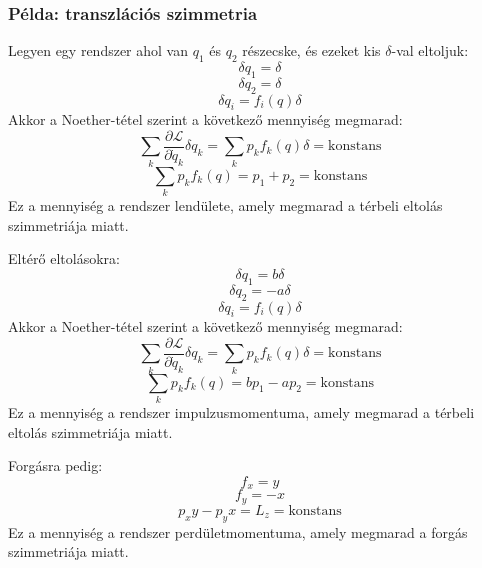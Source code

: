 \documentclass[a4paper,12pt]{article}
\begin{document}
\subsubsection*{Példa: transzlációs szimmetria}
Legyen egy rendszer ahol van $q_1$ és $q_2$ részecske, és ezeket kis $\delta$-val eltoljuk:
\begin{equation}
    \delta q_1 = \delta
\end{equation}
\begin{equation}
    \delta q_2 = \delta
\end{equation}
\begin{equation}
    \delta q_i = f_i(q) \delta
\end{equation}
Akkor a Noether-tétel szerint a következő mennyiség megmarad:
\begin{equation}
    \sum_k \frac{\partial \mathcal{L}}{\partial \dot{q}_k} \delta q_k = \sum_k p_k f_k(q) \delta = \text{konstans}
\end{equation}
\begin{equation}
    \sum_k p_k f_k(q) = p_1 + p_2 = \text{konstans}
\end{equation}
Ez a mennyiség a rendszer lendülete, amely megmarad a térbeli eltolás szimmetriája miatt.

Eltérő eltolásokra:
\begin{equation}
    \delta q_1 = b\delta
\end{equation}
\begin{equation}
    \delta q_2 = - a\delta
\end{equation}
\begin{equation}
    \delta q_i = f_i(q) \delta
\end{equation}
Akkor a Noether-tétel szerint a következő mennyiség megmarad:
\begin{equation}
    \sum_k \frac{\partial \mathcal{L}}{\partial \dot{q}_k} \delta q_k = \sum_k p_k f_k(q) \delta = \text{konstans}
\end{equation}
\begin{equation}
    \sum_k p_k f_k(q) = b p_1 - a p_2 = \text{konstans}
\end{equation}
Ez a mennyiség a rendszer impulzusmomentuma, amely megmarad a térbeli eltolás szimmetriája miatt.

Forgásra pedig:
\begin{equation}
    f_x = y
\end{equation}
\begin{equation}
    f_y = -x
\end{equation}
\begin{equation}
    p_x y - p_y x = L_z = \text{konstans}
\end{equation}
Ez a mennyiség a rendszer perdületmomentuma, amely megmarad a forgás szimmetriája miatt.
\end{document}
